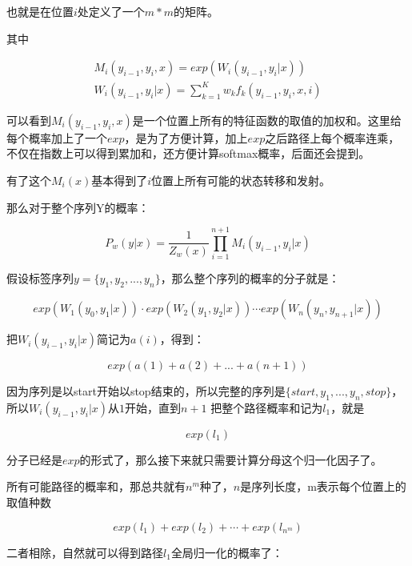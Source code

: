 \documentclass[11pt]{article}
\begin{document}
也就是在位置$i$处定义了一个$m*m$的矩阵。

其中

\begin{gather*}\label{key}
	M_i(y_{i-1}, y_i, x) = exp(W_i(y_{i-1}, y_i|x))\\
	W_i(y_{i-1}, y_i|x) = \sum_{k=1}^K w_kf_k(y_{i-1}, y_i, x, i)
\end{gather*}

可以看到$M_i(y_{i-1}, y_i, x)$是一个位置上所有的特征函数的取值的加权和。这里给每个概率加上了一个$exp$，是为了方便计算，加上$exp$之后路径上每个概率连乘，不仅在指数上可以得到累加和，还方便计算softmax概率，后面还会提到。

有了这个$M_i(x)$基本得到了$i$位置上所有可能的状态转移和发射。

那么对于整个序列Y的概率：

\begin{equation}\label{key}
	P_w(y|x) = \frac{1}{Z_w(x)}\prod_{i=1}^{n+1} M_i(y_{i-1}, y_i|x)
\end{equation}

假设标签序列$y = \{y_1, y_2, ..., y_n\}$，那么整个序列的概率的分子就是：

\begin{equation}\label{key}
	exp(W_1(y_{0}, y_1|x)) \cdot exp(W_2(y_{1}, y_2|x)) \cdots exp(W_n(y_{n}, y_{n+1}|x))
\end{equation}

把$W_i(y_{i-1}, y_i|x)$简记为$a(i)$，得到：

\begin{equation}\label{key}
	exp(a(1)+a(2)+...+a(n+1))
\end{equation}

因为序列是以start开始以stop结束的，所以完整的序列是$\{start, y_1, ..., y_n, stop\}$，所以$W_i(y_{i-1}, y_i|x)$从$1$开始，直到$n+1$
把整个路径概率和记为$l_1$，就是

\begin{equation}\label{key}
	exp(l_1)
\end{equation}

分子已经是$exp$的形式了，那么接下来就只需要计算分母这个归一化因子了。

所有可能路径的概率和，那总共就有$n^m$种了，$n$是序列长度，m表示每个位置上的取值种数

\begin{equation}\label{key}
	exp(l_1) + exp(l_2) + \cdots + exp(l_{n^m})
\end{equation}

二者相除，自然就可以得到路径$l_1$全局归一化的概率了：
\end{document}

